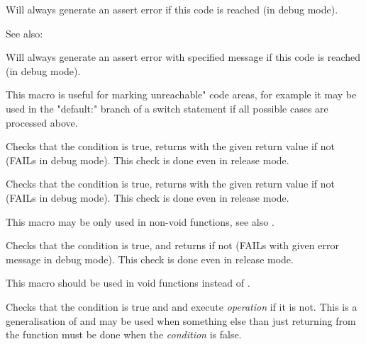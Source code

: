 \label{wxfail}


Will always generate an assert error if this code is reached (in debug mode).

See also: 


\label{wxfailmsg}


Will always generate an assert error with specified message if this code is reached (in debug mode).

This macro is useful for marking unreachable" code areas, for example
it may be used in the "default:" branch of a switch statement if all possible
cases are processed above.




\label{wxcheck}


Checks that the condition is true, returns with the given return value if not (FAILs in debug mode).
This check is done even in release mode.


\label{wxcheckmsg}


Checks that the condition is true, returns with the given return value if not (FAILs in debug mode).
This check is done even in release mode.

This macro may be only used in non-void functions, see also
.


\label{wxcheckret}


Checks that the condition is true, and returns if not (FAILs with given error
message in debug mode). This check is done even in release mode.

This macro should be used in void functions instead of
.


\label{wxcheck2}


Checks that the condition is true and  and execute
{\it operation} if it is not. This is a generalisation of
 and may be used when something else than just
returning from the function must be done when the {\it condition} is false.

